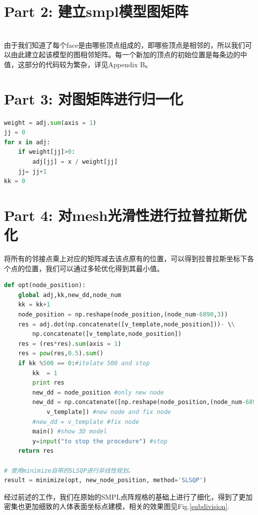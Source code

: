 \documentclass{article}
\begin{document}
\chapter{Part 2: 建立smpl模型图矩阵}\\
由于我们知道了每个face是由哪些顶点组成的，即哪些顶点是相邻的，所以我们可以由此建立起该模型的图相邻矩阵。每一个新加的顶点的初始位置是每条边的中值，这部分的代码较为繁杂，详见Appendix B。

\chapter{Part 3: 对图矩阵进行归一化}
\begin{lstlisting}[language=python]
weight = adj.sum(axis = 1)
jj = 0
for x in adj:
    if weight[jj]>0:
        adj[jj] = x / weight[jj]
    jj= jj+1    
kk = 0	
\end{lstlisting}


\chapter{Part 4: 对mesh光滑性进行拉普拉斯优化}
将所有的邻接点乘上对应的矩阵减去该点原有的位置，可以得到拉普拉斯坐标下各个点的位置，我们可以通过多轮优化得到其最小值。
\begin{lstlisting}[language=python]
def opt(node_position):
    global adj,kk,new_dd,node_num
    kk = kk+1
    node_position = np.reshape(node_position,(node_num-6890,3))
    res = adj.dot(np.concatenate([v_template,node_position]))- \\
    	np.concatenate([v_template,node_position])
    res = (res*res).sum(axis = 1)
    res = pow(res,0.5).sum()
    if kk %500 == 0:#itelate 500 and stop
        kk  = 1
        print res
        new_dd = node_position #only new node
        new_dd = np.concatenate([np.reshape(node_position,(node_num-6890,3)),	\\
        	v_template]) #new node and fix node
        #new_dd = v_template #fix node
        main() #show 3D model
        y=input("to stop the procedure") #stop
    return res	

# 使用minimize自带的SLSQP进行非线性规划。
result = minimize(opt, new_node_position, method='SLSQP')
\end{lstlisting}

经过前述的工作，我们在原始的SMPL点阵规格的基础上进行了细化，得到了更加密集也更加细致的人体表面坐标点建模，相关的效果图见Fig.\ref{subdivision}.
\end{document}
